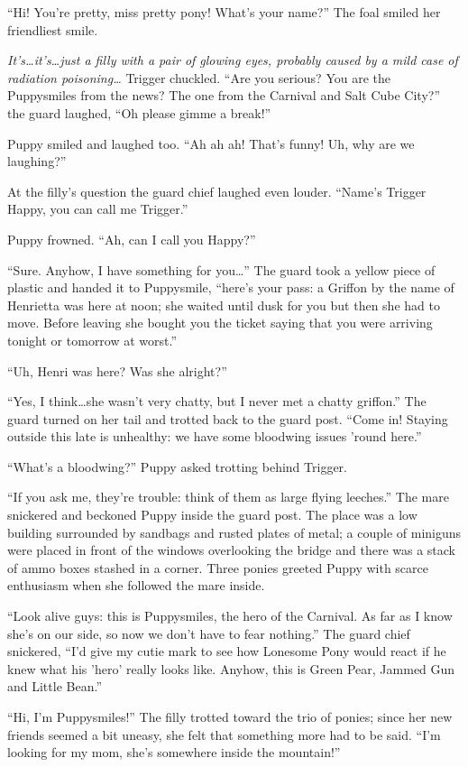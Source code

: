 ``Hi! You're pretty, miss pretty pony! What's your name?'' The foal smiled her friendliest smile.

\emph{It's\dots it's\dots just a filly with a pair of glowing eyes, probably caused by a mild case of radiation poisoning\dots} Trigger chuckled. ``Are you serious? You are the Puppysmiles from the news? The one from the Carnival and Salt Cube City?'' the guard laughed, ``Oh please gimme a break!''

Puppy smiled and laughed too. ``Ah ah ah! That's funny! Uh, why are we laughing?''

At the filly's question the guard chief laughed even louder. ``Name's Trigger Happy, you can call me Trigger.''

Puppy frowned. ``Ah, can I call you Happy?''

``Sure. Anyhow, I have something for you\dots'' The guard took a yellow piece of plastic and handed it to Puppysmile, ``here's your pass: a Griffon by the name of Henrietta was here at noon; she waited until dusk for you but then she had to move. Before leaving she bought you the ticket saying that you were arriving tonight or tomorrow at worst.''

``Uh, Henri was here? Was she alright?''

``Yes, I think\dots she wasn't very chatty, but I never met a chatty griffon.'' The guard turned on her tail and trotted back to the guard post. ``Come in! Staying outside this late is unhealthy: we have some bloodwing issues 'round here.''

``What's a bloodwing?'' Puppy asked trotting behind Trigger.

``If you ask me, they're trouble: think of them as large flying leeches.'' The mare snickered and beckoned Puppy inside the guard post. The place was a low building surrounded by sandbags and rusted plates of metal; a couple of miniguns were placed in front of the windows overlooking the bridge and there was a stack of ammo boxes stashed in a corner. Three ponies greeted Puppy with scarce enthusiasm when she followed the mare inside.

``Look alive guys: this is Puppysmiles, the hero of the Carnival. As far as I know she's on our side, so now we don't have to fear nothing.'' The guard chief snickered, ``I'd give my cutie mark to see how Lonesome Pony would react if he knew what his 'hero' really looks like. Anyhow, this is Green Pear, Jammed Gun and Little Bean.''

``Hi, I'm Puppysmiles!'' The filly trotted toward the trio of ponies; since her new friends seemed a bit uneasy, she felt that something more had to be said. ``I'm looking for my mom, she's somewhere inside the mountain!''

